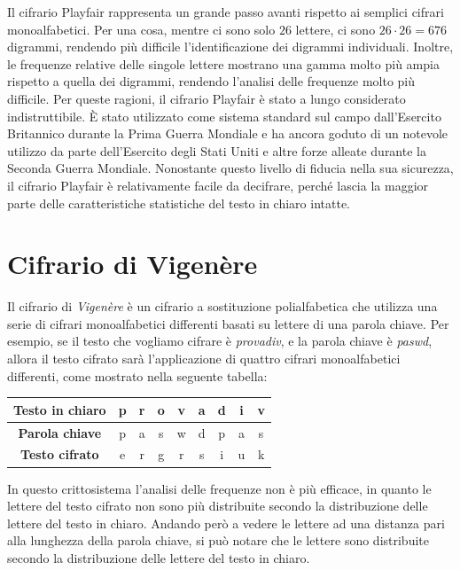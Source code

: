 Il cifrario Playfair rappresenta un grande passo avanti rispetto ai semplici cifrari monoalfabetici.
Per una cosa, mentre ci sono solo $26$ lettere, ci sono $26 \cdot 26 = 676$ digrammi, rendendo
più difficile l'identificazione dei digrammi individuali. Inoltre, le frequenze relative delle singole
lettere mostrano una gamma molto più ampia rispetto a quella dei digrammi, rendendo l'analisi delle
frequenze molto più difficile. Per queste ragioni, il cifrario Playfair è stato a lungo considerato
indistruttibile. È stato utilizzato come sistema standard sul campo dall'Esercito Britannico durante
la Prima Guerra Mondiale e ha ancora goduto di un notevole utilizzo da parte dell'Esercito degli Stati
Uniti e altre forze alleate durante la Seconda Guerra Mondiale.
Nonostante questo livello di fiducia nella sua sicurezza, il cifrario Playfair è relativamente facile
da decifrare, perché lascia la maggior parte delle caratteristiche statistiche del testo in chiaro
intatte. 
\section{Cifrario di Vigenère}
Il cifrario di \textit{Vigenère} è un cifrario a sostituzione polialfabetica che utilizza una serie
di cifrari monoalfabetici differenti basati su lettere di una parola chiave. Per esempio, se il testo 
che vogliamo cifrare è \textit{provadiv}, e la parola chiave è \textit{paswd}, allora il testo
cifrato sarà l'applicazione di quattro cifrari monoalfabetici differenti, come mostrato nella seguente
tabella:
\begin{center}
    \begin{tabular}{|c|c|c|c|c|c|c|c|c|}
    \hline
     \textbf{Testo in chiaro} & p & r & o & v & a & d & i & v \\
     \hline
     \textbf{Parola chiave} & p & a & s & w & d & p & a & s \\
     \hline
     \textbf{Testo cifrato} & e & r & g & r & s & i & u & k \\
     
     \hline
    \end{tabular}
\end{center}
In questo crittosistema l'analisi delle frequenze non è più efficace, in quanto le lettere
del testo cifrato non sono più distribuite secondo la distribuzione delle lettere del testo in chiaro.
Andando però a vedere le lettere ad una distanza pari alla lunghezza della parola chiave, si può
notare che le lettere sono distribuite secondo la distribuzione delle lettere del testo in chiaro.

